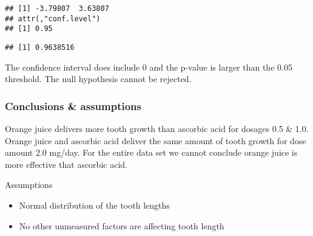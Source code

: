 \documentclass[
]{article}
\newenvironment{Shaded}{\begin{snugshade}}{\end{snugshade}}
\newcommand{\NormalTok}[1]{#1}
\newcommand{\SpecialCharTok}[1]{\textcolor[rgb]{0.00,0.00,0.00}{#1}}
\providecommand{\tightlist}{%
  \setlength{\itemsep}{0pt}\setlength{\parskip}{0pt}}
\begin{document}
\begin{verbatim}
## [1] -3.79807  3.63807
## attr(,"conf.level")
## [1] 0.95
\end{verbatim}

\begin{Shaded}
\end{Shaded}

\begin{verbatim}
## [1] 0.9638516
\end{verbatim}

The confidence interval does include 0 and the p-value is larger than
the 0.05 threshold. The null hypothesis cannot be rejected.

\hypertarget{conclusions-assumptions}{%
\subsubsection{Conclusions \&
assumptions}\label{conclusions-assumptions}}

Orange juice delivers more tooth growth than ascorbic acid for dosages
0.5 \& 1.0. Orange juice and ascorbic acid deliver the same amount of
tooth growth for dose amount 2.0 mg/day. For the entire data set we
cannot conclude orange juice is more effective that ascorbic acid.

Assumptions

\begin{itemize}
\tightlist
\item
  Normal distribution of the tooth lengths
\item
  No other unmeasured factors are affecting tooth length
\end{itemize}
\end{document}
